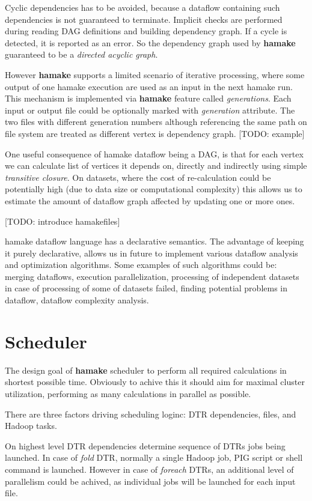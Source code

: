 \documentclass[10pt,conference,letterpaper]{IEEEtran}
\begin{document}
Cyclic dependencies has to be avoided, because a dataflow containing
such dependencies is not guaranteed to terminate. Implicit checks are
performed during reading DAG definitions and building dependency
graph. If a cycle is detected, it is reported as an error. So the
dependency graph used by \textbf{hamake} guaranteed to be a
\textit{directed acyclic graph}.

However \textbf{hamake} supports a limited scenario of iterative
processing, where some output of one hamake execution are used as an
input in the next hamake run. This mechanism is implemented via
\textbf{hamake} feature called \textit{generations}. Each input or
output file could be optionally marked with \emph{generation}
attribute. The two files with different generation numbers although
referencing the same path on file system are treated as different
vertex is dependency graph. [TODO: example]

One useful consequence of hamake dataflow being a DAG, is that for
each vertex we can calculate list of vertices it depends on, directly
and indirectly using simple \textit{transitive closure}. On datasets,
where the cost of re-calculation could be potentially high (due to
data size or computational complexity) this allows us to estimate the
amount of dataflow graph affected by updating one or more ones.

[TODO: introduce hamakefiles]

hamake dataflow language has a declarative semantics. The advantage of
keeping it purely declarative, allows us in future to implement
various dataflow analysis and optimization algorithms. Some examples
of such algorithms could be: merging dataflows, execution
parallelization, processing of independent datasets in case of
processing of some of datasets failed, finding potential problems in
dataflow, dataflow complexity analysis.

\section{Scheduler}

The design goal of \textbf{hamake} scheduler to perform all required
calculations in shortest possible time. Obviously to achive this it
should aim for maximal cluster utilization, performing as many
calculations in parallel as possible.

There are three factors driving scheduling loginc: DTR dependencies,
files, and Hadoop tasks.

On highest level DTR dependencies determine sequence of DTRs jobs
being launched. In case of \emph{fold} DTR, normally a single Hadoop
job, PIG script or shell command is launched. However in case of
\emph{foreach} DTRs, an additional level of parallelism could be
achived, as individual jobs will be launched for each input file.
\end{document}
